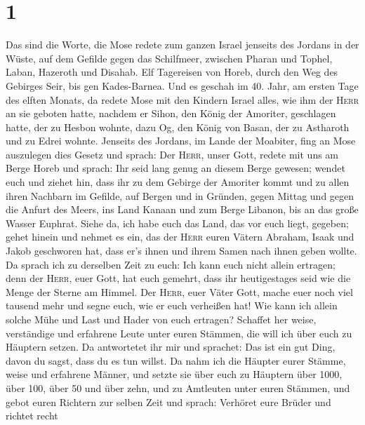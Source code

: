 \hypertarget{section}{%
\section{1}\label{section}}

 Das sind die Worte, die Mose redete zum ganzen Israel
jenseits des Jordans in der Wüste, auf dem Gefilde gegen das Schilfmeer,
zwischen Pharan und Tophel, Laban, Hazeroth und Disahab. 
Elf Tagereisen von Horeb, durch den Weg des Gebirges Seir, bis gen
Kades-Barnea.  Und es geschah im 40. Jahr, am ersten Tage
des elften Monats, da redete Mose mit den Kindern Israel alles, wie ihm
der \textsc{Herr} an sie geboten hatte,  nachdem er Sihon,
den König der Amoriter, geschlagen hatte, der zu Hesbon wohnte, dazu Og,
den König von Basan, der zu Astharoth und zu Edrei wohnte.
 Jenseits des Jordans, im Lande der Moabiter, fing an Mose
auszulegen dies Gesetz und sprach:  Der \textsc{Herr},
unser Gott, redete mit uns am Berge Horeb und sprach: Ihr seid lang
genug an diesem Berge gewesen;  wendet euch und ziehet
hin, dass ihr zu dem Gebirge der Amoriter kommt und zu allen ihren
Nachbarn im Gefilde, auf Bergen und in Gründen, gegen Mittag und gegen
die Anfurt des Meers, ins Land Kanaan und zum Berge Libanon, bis an das
große Wasser Euphrat.  Siehe da, ich habe euch das Land,
das vor euch liegt, gegeben; gehet hinein und nehmet es ein, das der
\textsc{Herr} euren Vätern Abraham, Isaak und Jakob geschworen hat, dass
er's ihnen und ihrem Samen nach ihnen geben wollte.  Da
sprach ich zu derselben Zeit zu euch: Ich kann euch nicht allein
ertragen;  denn der \textsc{Herr}, euer Gott, hat euch
gemehrt, dass ihr heutigestages seid wie die Menge der Sterne am Himmel.
 Der \textsc{Herr}, euer Väter Gott, mache euer noch viel
tausend mehr und segne euch, wie er euch verheißen hat! 
Wie kann ich allein solche Mühe und Last und Hader von euch ertragen?
 Schaffet her weise, verständige und erfahrene Leute
unter euren Stämmen, die will ich über euch zu Häuptern setzen.
 Da antwortetet ihr mir und sprachet: Das ist ein gut
Ding, davon du sagst, dass du es tun willst.  Da nahm ich
die Häupter eurer Stämme, weise und erfahrene Männer, und setzte sie
über euch zu Häuptern über 1000, über 100, über 50 und über zehn, und zu
Amtleuten unter euren Stämmen,  und gebot euren Richtern
zur selben Zeit und sprach: Verhöret eure Brüder und richtet recht
